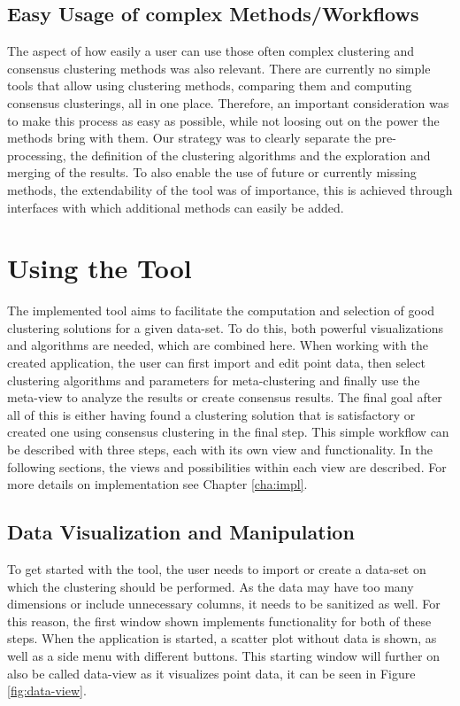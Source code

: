 \documentclass[
	a4paper,
	english,
	twoside,
	openright,               
	11pt                            
	]{report}
\begin{document}
\section{Easy Usage of complex Methods/Workflows}
The aspect of how easily a user can use those often complex clustering and consensus clustering methods was also relevant. There are currently no simple tools that allow using clustering methods, comparing them and computing consensus clusterings, all in one place. Therefore, an important consideration was to make this process as easy as possible, while not loosing out on the power the methods bring with them. Our strategy was to clearly separate the pre-processing, the definition of the clustering algorithms and the exploration and merging of the results. To also enable the use of future or currently missing methods, the extendability of the tool was of importance, this is achieved through interfaces with which additional methods can easily be added.

\chapter{Using the Tool}\label{cha:Tool}
The implemented tool aims to facilitate the computation and selection of good clustering solutions for a given data-set. To do this, both powerful visualizations and algorithms are needed, which are combined here. When working with the created application, the user can first import and edit point data, then select clustering algorithms and parameters for meta-clustering and finally use the meta-view to analyze the results or create consensus results. The final goal after all of this is either having found a clustering solution that is satisfactory or created one using consensus clustering in the final step. This simple workflow can be described with three steps, each with its own view and functionality. In the following sections, the views and possibilities within each view are described. For more details on implementation see Chapter \ref{cha:impl}.

\section{Data Visualization and Manipulation}
To get started with the tool, the user needs to import or create a data-set on which the clustering should be performed. As the data may have too many dimensions or include unnecessary columns, it needs to be sanitized as well. For this reason, the first window shown implements functionality for both of these steps. When the application is started, a scatter plot without data is shown, as well as a side menu with different buttons. This starting window will further on also be called data-view as it visualizes point data, it can be seen in Figure \ref{fig:data-view}. 
\end{document}
